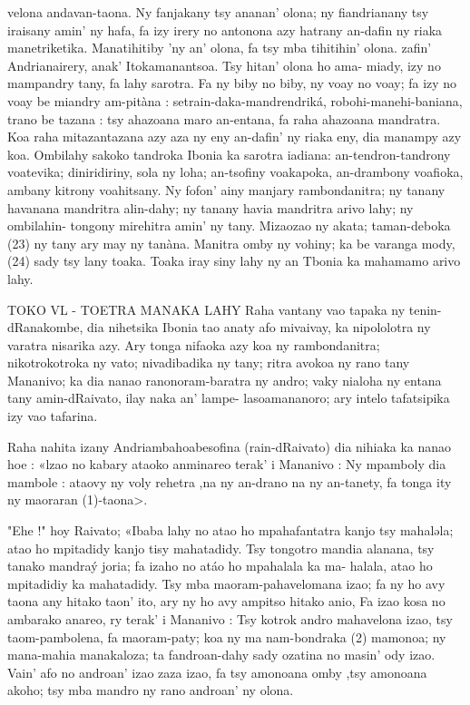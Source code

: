 velona andavan-taona. Ny fanjakany tsy ananan' olona; ny fiandrianany tsy
iraisany amin' ny hafa, fa izy irery no antonona azy hatrany an-dafin ny
riaka manetriketika. Manatihitiby 'ny an' olona, fa tsy mba tihitihin' olona.
zafin' Andrianairery, anak' Itokamanantsoa. Tsy hitan' olona ho ama-
miady, izy no mampandry tany, fa lahy sarotra. Fa ny biby no biby, ny voay
no voay; fa izy no voay be miandry am-pitàna : setrain-daka-mandrendriká,
robohi-manehi-baniana, trano be tazana : tsy ahazoana maro an-entana, fa
raha ahazoana mandratra. Koa raha mitazantazana azy aza ny eny
an-dafin' ny riaka eny, dia manampy azy koa. Ombilahy sakoko tandroka
Ibonia ka sarotra iadiana: an-tendron-tandrony voatevika; diniridiriny, sola
ny loha; an-tsofiny voakapoka, an-drambony voafioka, ambany kitrony
voahitsany. Ny fofon' ainy manjary rambondanitra; ny tanany havanana
mandritra alin-dahy; ny tanany havia mandritra arivo lahy; ny ombilahin-
tongony mirehitra amin' ny tany. Mizaozao ny akata; taman-deboka (23) ny
tany ary may ny tanàna. Manitra omby ny vohiny; ka be varanga mody,
(24) sady tsy lany toaka. Toaka iray siny lahy ny an Tbonia ka mahamamo
arivo lahy.

TOKO VL - TOETRA MANAKA LAHY
Raha vantany vao tapaka ny tenin-dRanakombe, dia nihetsika Ibonia
tao anaty afo mivaivay, ka nipololotra ny varatra nisarika azy. Ary tonga
nifaoka azy koa ny rambondanitra; nikotrokotroka ny vato; nivadibadika ny
tany; ritra avokoa ny rano tany Mananivo; ka dia nanao ranonoram-baratra
ny andro; vaky nialoha ny entana tany amin-dRaivato, ilay naka an' lampe-
lasoamananoro; ary intelo tafatsipika izy vao tafarina.

Raha nahita izany Andriambahoabesofina (rain-dRaivato) dia nihiaka
ka nanao hoe : «lzao no kabary ataoko anminareo terak' i Mananivo : Ny
mpamboly dia mambole : ataovy ny voly rehetra ,na ny an-drano na ny
an-tanety, fa tonga ity ny maoraran (1)-taona>.

"Ehe !" hoy Raivato; «Ibaba lahy no atao ho mpahafantatra kanjo tsy
mahaləla; atao ho mpitadidy kanjo tisy mahatadidy. Tsy tongotro mandia
alanana, tsy tanako mandraý joria; fa izaho no atáo ho mpahalala ka ma-
halala, atao ho mpitadidiy ka mahatadidy. Tsy mba maoram-pahavelomana
izao; fa ny ho avy taona any hitako taon' ito, ary ny ho avy ampitso hitako
anio, Fa izao kosa no ambarako anareo, ry terak' i Mananivo : Tsy kotrok
andro mahavelona izao, tsy taom-pambolena, fa maoram-paty; koa ny ma
nam-bondraka (2) mamonoa; ny mana-mahia manakaloza; ta fandroan-dahy
sady ozatina no masin' ody izao. Vain' afo no androan' izao zaza izao, fa tsy
amonoana omby ,tsy amonoana akoho; tsy mba mandro ny rano androan' ny
olona.

